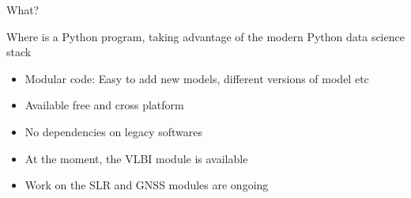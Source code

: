 \documentclass[ignorenonframetext,12pt,t]{beamer}
\begin{document}
\begin{frame}{What?}
  \begin{centering}
    Where is a Python program, taking advantage of the modern Python data science stack
  \end{centering}
  \pause

  \begin{itemize}
   \item Modular code: Easy to add new models, different versions of model etc
   \item Available free and cross platform
   \item No dependencies on legacy softwares
  \end{itemize}
  \pause

  \begin{itemize}
  \item At the moment, the VLBI module is available
  \item Work on the SLR and GNSS modules are ongoing
  \end{itemize}
\end{frame}
\end{document}
